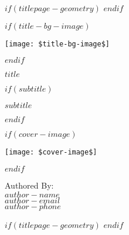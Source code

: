 
$if(titlepage-geometry)$
$endif$
\begin{minipage}[b][\textheight][s]{\textwidth}
\raggedright

$if(title-bg-image)$
\begin{center}
    \texttt{[image: \$title-bg-image\$]}
\end{center}
$endif$

\vspace{7\baselineskip}

\begin{center}
  {\Huge\bfseries\nohyphens{$title$}}\\[2\baselineskip]
\end{center}
$if(subtitle)$
\begin{center}
  {\huge{$subtitle$}}
\end{center}
$endif$

$if(cover-image)$
\begin{center}
    \texttt{[image: \$cover-image\$]}
\end{center}
$endif$

\vfill

{\LARGE{Authored By:}}\\[1\baselineskip]
{\LARGE{$author-name$}}\\[1\baselineskip]
\href{mailto:{$author-email$}}{\LARGE{{$author-email$}}}\\[1\baselineskip]
{\LARGE{$author-phone$}}

\end{minipage}
$if(titlepage-geometry)$
\restoregeometry
$endif$
